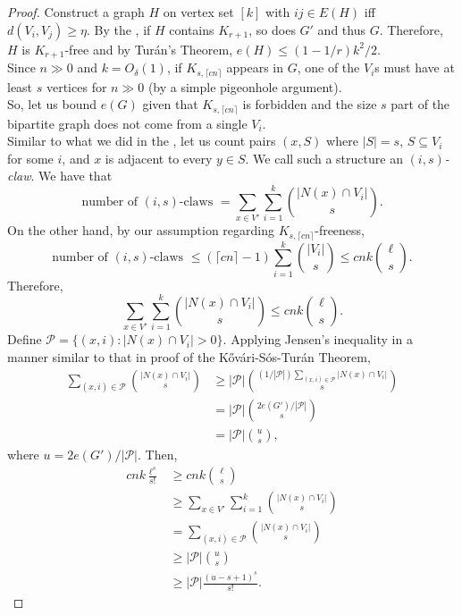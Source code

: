 \begin{proof}
				Construct a graph $H$ on vertex set $[k]$ with $ij\in E(H)$ iff $d(V_i,V_j)\ge \eta$. By the , if $H$ contains $K_{r+1}$, so does $G'$ and thus $G$.
				Therefore, $H$ is $K_{r+1}$-free and by Tur\'{a}n's Theorem, $e(H) \le (1-1/r)k^2/2$.\\
				Since $n\gg 0$ and $k=O_\delta(1)$, if $K_{s,\lceil cn\rceil}$ appears in $G$, one of the $V_i$s must have at least $s$ vertices for $n\gg 0$ (by a simple pigeonhole argument).\\
				So, let us bound $e(G)$ given that $K_{s,\lceil cn\rceil}$ is forbidden and the size $s$ part of the bipartite graph does not come from a single $V_i$.\\
				Similar to what we did in the , let us count pairs $(x,S)$ where $|S|=s$, $S\subseteq V_i$ for some $i$, and $x$ is adjacent to every $y\in S$. We call such a structure an \emph{$(i,s)$-claw}. We have that
					\[ \text{number of $(i,s)$-claws } = \sum_{x\in V'} \sum_{i=1}^{k} \binom{|N(x)\cap V_i|}{s}. \]
				On the other hand, by our assumption regarding $K_{s,\lceil cn\rceil}$-freeness,
					\[ \text{number of $(i,s)$-claws } \le ( \lceil cn\rceil - 1 ) \sum_{i=1}^k \binom{|V_i|}{s} \le cn k \binom{\ell}{s}. \]
				Therefore,
					\[ \sum_{x\in V'}\sum_{i=1}^{k} \binom{|N(x)\cap V_i|}{s} \le cn k \binom{\ell}{s}. \]
				Define $\mathcal{P} = \{ (x,i) : |N(x)\cap V_i| > 0 \}$. Applying Jensen's inequality in a manner similar to that in proof of the K\H{o}v\'{a}ri-S\'{o}s-Tur\'{a}n Theorem,
					\begin{align*}
						\sum_{(x,i)\in\mathcal{P}} \binom{|N(x)\cap V_i|}{s} &\ge |\mathcal{P}| \binom{(1/|\mathcal{P}|) \sum_{(x,i)\in\mathcal{P}} | N(x) \cap V_i| }{s} \\
						&= |\mathcal{P}| \binom{2e(G')/|\mathcal{P}|}{s} \\
						&= |\mathcal{P}| \binom{u}{s},
					\end{align*}
				where $u = 2e(G')/|\mathcal{P}|$. Then,
					\begin{align*}
						cn k \frac{\ell^s}{s!}  &\ge cn k \binom{\ell}{s} \\
						&\ge \sum_{x\in V'}\sum_{i=1}^{k} \binom{|N(x)\cap V_i|}{s} \\
						&= \sum_{(x,i) \in \mathcal{P}} \binom{|N(x)\cap V_i|}{s} \\
						&\ge |\mathcal{P}| \binom{u}{s} \\
						&\ge |\mathcal{P}| \frac{(u-s+1)^s}{s!}.
					\end{align*}

\end{proof}
